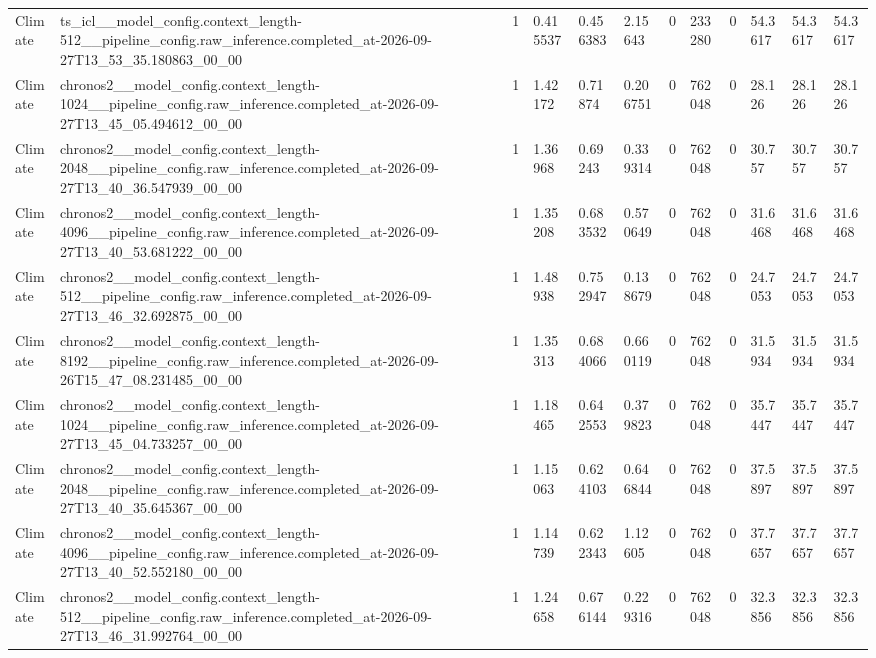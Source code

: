 \begin{tabular}{llllllllllll}
Climate & ts\_icl\_\_model\_config.context\_length-512\_\_pipeline\_config.raw\_inference.completed\_at-2026-09-27T13\_53\_35.180863\_00\_00 & 1 & 0.415537 & 0.456383 & 2.15643 & 0 & 233280 & 0 & 54.3617 & 54.3617 & 54.3617 \\
Climate & chronos2\_\_model\_config.context\_length-1024\_\_pipeline\_config.raw\_inference.completed\_at-2026-09-27T13\_45\_05.494612\_00\_00 & 1 & 1.42172 & 0.71874 & 0.206751 & 0 & 762048 & 0 & 28.126 & 28.126 & 28.126 \\
Climate & chronos2\_\_model\_config.context\_length-2048\_\_pipeline\_config.raw\_inference.completed\_at-2026-09-27T13\_40\_36.547939\_00\_00 & 1 & 1.36968 & 0.69243 & 0.339314 & 0 & 762048 & 0 & 30.757 & 30.757 & 30.757 \\
Climate & chronos2\_\_model\_config.context\_length-4096\_\_pipeline\_config.raw\_inference.completed\_at-2026-09-27T13\_40\_53.681222\_00\_00 & 1 & 1.35208 & 0.683532 & 0.570649 & 0 & 762048 & 0 & 31.6468 & 31.6468 & 31.6468 \\
Climate & chronos2\_\_model\_config.context\_length-512\_\_pipeline\_config.raw\_inference.completed\_at-2026-09-27T13\_46\_32.692875\_00\_00 & 1 & 1.48938 & 0.752947 & 0.138679 & 0 & 762048 & 0 & 24.7053 & 24.7053 & 24.7053 \\
Climate & chronos2\_\_model\_config.context\_length-8192\_\_pipeline\_config.raw\_inference.completed\_at-2026-09-26T15\_47\_08.231485\_00\_00 & 1 & 1.35313 & 0.684066 & 0.660119 & 0 & 762048 & 0 & 31.5934 & 31.5934 & 31.5934 \\
Climate & chronos2\_\_model\_config.context\_length-1024\_\_pipeline\_config.raw\_inference.completed\_at-2026-09-27T13\_45\_04.733257\_00\_00 & 1 & 1.18465 & 0.642553 & 0.379823 & 0 & 762048 & 0 & 35.7447 & 35.7447 & 35.7447 \\
Climate & chronos2\_\_model\_config.context\_length-2048\_\_pipeline\_config.raw\_inference.completed\_at-2026-09-27T13\_40\_35.645367\_00\_00 & 1 & 1.15063 & 0.624103 & 0.646844 & 0 & 762048 & 0 & 37.5897 & 37.5897 & 37.5897 \\
Climate & chronos2\_\_model\_config.context\_length-4096\_\_pipeline\_config.raw\_inference.completed\_at-2026-09-27T13\_40\_52.552180\_00\_00 & 1 & 1.14739 & 0.622343 & 1.12605 & 0 & 762048 & 0 & 37.7657 & 37.7657 & 37.7657 \\
Climate & chronos2\_\_model\_config.context\_length-512\_\_pipeline\_config.raw\_inference.completed\_at-2026-09-27T13\_46\_31.992764\_00\_00 & 1 & 1.24658 & 0.676144 & 0.229316 & 0 & 762048 & 0 & 32.3856 & 32.3856 & 32.3856 \\

\end{tabular}

